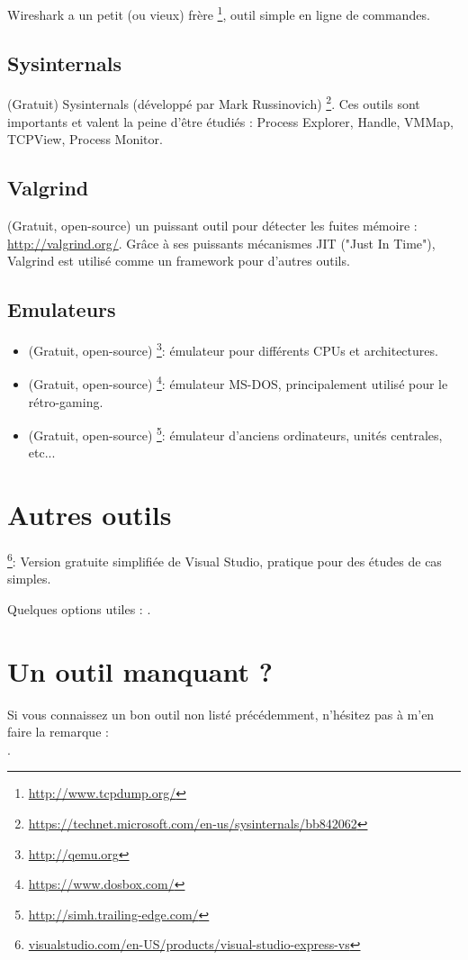 Wireshark a un petit (ou vieux) frère \footnote{\url{http://www.tcpdump.org/}}, outil simple en ligne de commandes.

\subsection{Sysinternals}

(Gratuit) Sysinternals (développé par Mark Russinovich)
\footnote{\url{https://technet.microsoft.com/en-us/sysinternals/bb842062}}.
Ces outils sont importants et valent la peine d'être étudiés : Process Explorer, Handle, VMMap, TCPView, Process Monitor.

\subsection{Valgrind}

(Gratuit, open-source) un puissant outil pour détecter les fuites mémoire : \url{http://valgrind.org/}.
Grâce à ses puissants mécanismes \ac{JIT} ("Just In Time"), Valgrind est utilisé comme un framework pour d'autres outils.


\subsection{Emulateurs}

\begin{itemize}
\item (Gratuit, open-source) \footnote{\url{http://qemu.org}}: émulateur pour différents CPUs et architectures.

\item (Gratuit, open-source) \footnote{\url{https://www.dosbox.com/}}: émulateur MS-DOS, principalement utilisé pour le rétro-gaming.

\item (Gratuit, open-source) \footnote{\url{http://simh.trailing-edge.com/}}: émulateur d'anciens ordinateurs, unités centrales, etc...
\end{itemize}

\section{Autres outils}

\footnote{\href{http://go.yurichev.com/17034}{visualstudio.com/en-US/products/visual-studio-express-vs}}:
Version gratuite simplifiée de Visual Studio, pratique pour des études de cas simples.

Quelques options utiles : .

\section{Un outil manquant ?}

Si vous connaissez un bon outil non listé précédemment, n'hésitez pas à m'en faire la remarque : \\
\TT{\EMAIL}.

